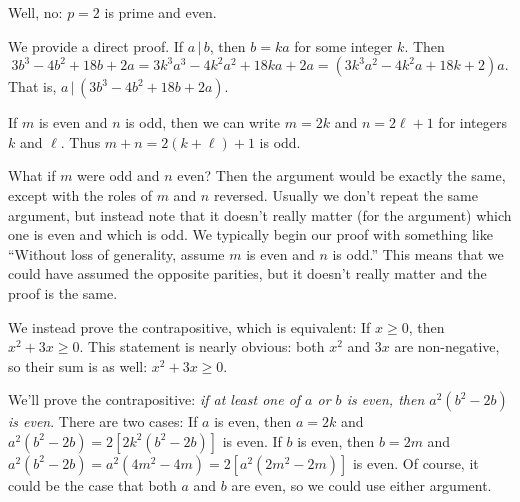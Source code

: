 \documentclass[12pt,letterpaper]{article}
\begin{document}
\begin{enumerate}
\begin{enumerate}
\begin{itemize}
    \end{itemize}



    \Part Well, no: $p=2$ is prime and even.

  \end{enumerate}

  \Answer We provide a direct proof.  If $a\,\big|\,b$, then $b=ka$
  for some integer $k$.  Then
  \begin{equation*}
    3b^3 - 4b^2 + 18 b  + 2a
    = 3k^3 a^3 - 4k^2a^2 + 18ka + 2a
    = \left( 3k^3a^2 - 4k^2a + 18k + 2 \right) a.
  \end{equation*}
  That is, $a\,\big|\,\left(3b^3-4b^2+18b+2a\right)$.

  \Answer If $m$ is even and $n$ is odd, then we can write $m=2k$ and
  $n=2\ell+1$ for integers $k$ and $\ell$. Thus $m+n = 2(k+\ell)+1$ is
  odd.  
  \medskip

  What if $m$ were odd and $n$ even?  Then the argument would be
  exactly the same, except with the roles of $m$ and $n$ reversed.
  Usually we don't repeat the same argument, but instead note that it
  doesn't really matter (for the argument) which one is even and which
  is odd.  We typically begin our proof with something like ``Without
  loss of generality, assume $m$ is even and $n$ is odd.''  This means
  that we could have assumed the opposite parities, but it doesn't
  really matter and the proof is the same.

  \Answer We instead prove the contrapositive, which is equivalent: If
  $x\ge0$, then $x^2+3x\ge 0$.  This statement is nearly obvious: both
  $x^2$ and $3x$ are non-negative, so their sum is as well: $x^2+3x\ge
  0$. 

  \Answer We'll prove the contrapositive: \emph{if at least one of $a$
    or $b$ is even, then $a^2(b^2-2b)$ is even}.  There are two cases:
  If $a$ is even, then $a = 2k$ and $a^2(b^2-2b) = 2\left[
    2k^2(b^2-2b) \right]$ is even.  If $b$ is even, then $b=2m$ and
  $a^2(b^2-2b) = a^2(4m^2 - 4m) = 2\left[ a^2(2m^2-2m) \right]$ is
  even.  Of course, it could be the case that both $a$ and $b$ are
  even, so we could use either argument.

\end{enumerate}
\end{document}
